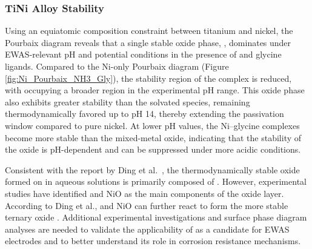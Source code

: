 \documentclass[journal=jacsat,manuscript=article]{achemso}
\begin{document}
\subsubsection{TiNi Alloy Stability}
Using an equiatomic composition constraint between titanium and nickel, the Pourbaix diagram reveals that a single stable oxide phase, , dominates under EWAS-relevant pH and potential conditions in the presence of  and glycine ligands. Compared to the Ni-only Pourbaix diagram (Figure \ref{fig:Ni_Pourbaix_NH3_Gly}), the stability region of the  complex is reduced, with  occupying a broader region in the experimental pH range. This oxide phase also exhibits greater stability than the solvated  species, remaining thermodynamically favored up to pH 14, thereby extending the passivation window compared to pure nickel. At lower pH values, the Ni–glycine complexes become more stable than the mixed-metal oxide, indicating that the stability of the oxide is pH-dependent and can be suppressed under more acidic conditions.

Consistent with the report by Ding et al.\ \cite{Ding2018ElectrochemicalStates}, the thermodynamically stable oxide formed on in aqueous solutions is primarily composed of . However, experimental studies \cite{Huang2005SurfaceAcidity, Clarke2006InfluenceRelease, Carroll2003CorrosionEnvironments} have identified  and NiO as the main components of the oxide layer. According to Ding et al.,  and NiO can further react to form the more stable ternary oxide . Additional experimental investigations and surface phase diagram analyses are needed to validate the applicability of  as a candidate for EWAS electrodes and to better understand its role in corrosion resistance mechanisms.



\end{document}
